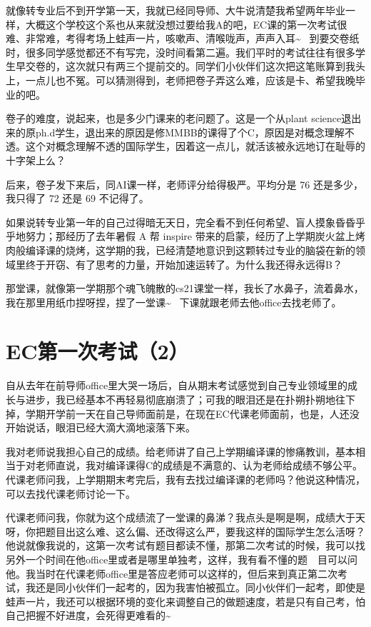 \documentclass[12pt]{book}
\begin{document}
就像转专业后不到开学第一天，我就已经同导师、大牛说清楚我希望两年毕业一样，大概这个学校这个系也从来就没想过要给我A的吧，EC课的第一次考试很难、非常难，考得考场上蛙声一片，咳嗽声、清喉咙声，声声入耳\textasciitilde{}~ 到要交卷纸时，很多同学感觉都还不有写完，没时间看第二遍。我们平时的考试往往有很多学生早交卷的，这次就只有两三个提前交的。同学们小伙伴们这次把这笔账算到我头上，一点儿也不冤。可以猜测得到，老师把卷子弄这么难，应该是卡、希望我晚毕业的吧。

卷子的难度，说起来，也是多少门课来的老问题了。这是一个从plant science退出来的原ph.d学生，退出来的原因是修MMBB的课得了个C，原因是对概念理解不透。这个对概念理解不透的国际学生，因着这一点儿，就活该被永远地订在耻辱的十字架上么？

后来，卷子发下来后，同AI课一样，老师评分给得极严。平均分是 76 还是多少，我只得了 72 还是 69 不记得了。

如果说转专业第一年的自己过得暗无天日，完全看不到任何希望、盲人摸象昏昏乎乎地努力；那经历了去年暑假 A 帮 inspire 带来的启蒙，经历了上学期炭火盆上烤肉般编译课的烧烤，这学期的我，已经清楚地意识到这颗转过专业的脑袋在新的领域里终于开窃、有了思考的力量，开始加速运转了。为什么我还得永远得B？

那堂课，就像第一学期那个魂飞魄散的cs21课堂一样，我长了水鼻子，流着鼻水，我在那里用纸巾捏呀捏，捏了一堂课\textasciitilde{}~ 下课就跟老师去他office去找老师了。

\section{EC第一次考试（2）}
\label{sec-28-2}

自从去年在前导师office里大哭一场后，自从期末考试感觉到自己专业领域里的成长与进步，我已经基本不再轻易彻底崩溃了；可我的眼泪还是在扑朔扑朔地往下掉，学期开学前一天在自己导师面前是，在现在EC代课老师面前，也是，人还没开始说话，眼泪已经大滴大滴地滚落下来。

我对老师说我担心自己的成绩。给老师讲了自己上学期编译课的惨痛教训，基本相当于对老师直说，我对编译课得C的成绩是不满意的、认为老师给成绩不够公平。代课老师问我，上学期期末考完后，我有去找过编译课的老师吗？他说这种情况，可以去找代课老师讨论一下。

代课老师问我，你就为这个成绩流了一堂课的鼻涕？我点头是啊是啊，成绩大于天呀，你把题目出这么难、这么偏、还改得这么严，要我这样的国际学生怎么活呀？他说就像我说的，这第一次考试有题目都读不懂，那第二次考试的时候，我可以找另外一个时间在他office里或者是哪里单独考，这样，我有看不懂的题　目可以问他。我当时在代课老师office里是答应老师可以这样的，但后来到真正第二次考试，我还是同小伙伴们一起考的，因为我害怕被孤立。同小伙伴们一起考，即使是蛙声一片，我还可以根据环境的变化来调整自己的做题速度，若是只有自己考，怕自己把握不好进度，会死得更难看的\textasciitilde{}~
\end{document}
